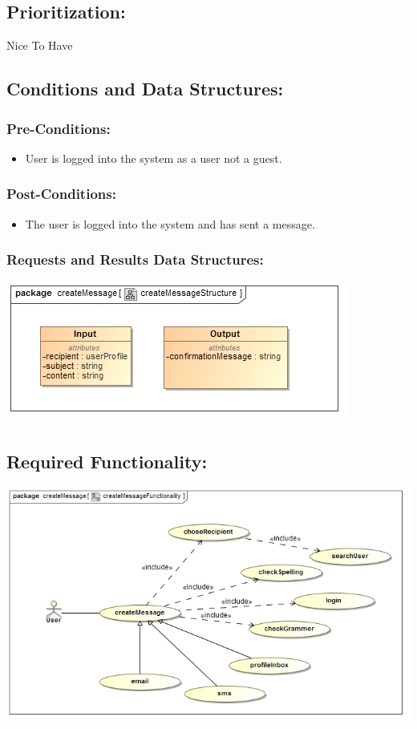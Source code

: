 \documentclass[a4paper,11pt]{article}
\begin{document}
\subsection{Prioritization:} 
\textbf{}Nice To Have
\subsection{Conditions and Data Structures:}
\subsubsection*{Pre-Conditions:}
\begin{itemize}
\item User is logged into the system as a user not a guest. 
\end{itemize}
\subsubsection*{Post-Conditions:}
\begin{itemize}
\item The user is logged into the system and has sent a message.
\end{itemize}
\subsubsection*{Requests and Results Data Structures:}
\includegraphics[width=1\linewidth]{./Images/PrivateMessage/createMessageStructure}
\subsection{Required Functionality:} 
\includegraphics[width=1\linewidth]{./Images/PrivateMessage/createMessageFunctionality}
\end{document}
